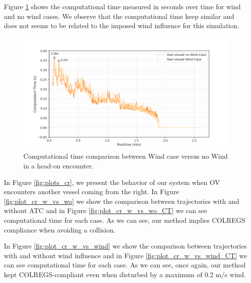         Figure \ref{fig:plot_ho_w_vs_wind_CT} shows the computational time measured in seconds over time for wind and no wind cases. We observe that the computational time keep similar and does not seems to be related to the imposed wind influence for this simulation.
        \begin{figure}[H]
            \centering
            \includegraphics[width=\textwidth]{figs/Chap5/plot_ho_w_vs_wind_CT.png}
            \caption{Computational time comparison between Wind case versus no Wind in a head-on encounter.}
            \label{fig:plot_ho_w_vs_wind_CT}
        \end{figure}
        
        In Figure \ref{fig:plots_cr}, we present the behavior of our system when \ac{OV} encounters another vessel coming from the right. In Figure \ref{fig:plot_cr_w_vs_wo} we show the comparison between trajectories with and without ATC and in Figure \ref{fig:plot_cr_w_vs_wo_CT} we can see computational time for each case. As we can see, our method implies COLREGS compliance when avoiding a collision.
        
        In Figure \ref{fig:plot_cr_w_vs_wind} we show the comparison between trajectories with and without wind influence and in Figure \ref{fig:plot_cr_w_vs_wind_CT} we can see computational time for each case. As we can see, once again, our method kept COLREGS-compliant even when disturbed by a maximum of 0.2 m/s wind.
        
